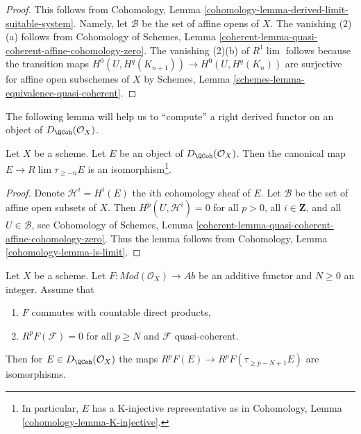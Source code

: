 \begin{proof}
This follows from Cohomology, Lemma
\ref{cohomology-lemma-derived-limit-suitable-system}.
Namely, let $\mathcal{B}$ be the set of affine opens of $X$.
The vanishing (2)(a) follows from
Cohomology of Schemes, Lemma
\ref{coherent-lemma-quasi-coherent-affine-cohomology-zero}.
The vanishing (2)(b) of $R^1\lim$ follows because the transition maps
$H^0(U, H^q(K_{n + 1})) \to H^0(U, H^q(K_n))$ are surjective
for affine open subschemes of $X$ by
Schemes, Lemma \ref{schemes-lemma-equivalence-quasi-coherent}.
\end{proof}

\noindent
The following lemma will help us to ``compute'' a right derived functor
on an object of $D_\QCoh(\mathcal{O}_X)$.

\begin{lemma}
\label{lemma-nice-K-injective}
Let $X$ be a scheme. Let $E$ be an object of
$D_\QCoh(\mathcal{O}_X)$. Then the canonical map
$E \to R\lim \tau_{\geq -n}E$ is an isomorphism\footnote{In particular,
$E$ has a K-injective representative as in
Cohomology, Lemma \ref{cohomology-lemma-K-injective}.}.
\end{lemma}

\begin{proof}
Denote $\mathcal{H}^i = H^i(E)$ the $i$th cohomology sheaf of $E$.
Let $\mathcal{B}$ be the set of affine open subsets of $X$. Then
$H^p(U, \mathcal{H}^i) = 0$ for all $p > 0$, all $i \in \mathbf{Z}$,
and all $U \in \mathcal{B}$, see
Cohomology of Schemes, Lemma
\ref{coherent-lemma-quasi-coherent-affine-cohomology-zero}.
Thus the lemma follows from
Cohomology, Lemma \ref{cohomology-lemma-is-limit}.
\end{proof}

\begin{lemma}
\label{lemma-application-nice-K-injective}
Let $X$ be a scheme. Let $F : \textit{Mod}(\mathcal{O}_X) \to \textit{Ab}$
be an additive functor and $N \geq 0$ an integer. Assume that
\begin{enumerate}
\item $F$ commutes with countable direct products,
\item $R^pF(\mathcal{F}) = 0$ for all $p \geq N$ and $\mathcal{F}$
quasi-coherent.
\end{enumerate}
Then for $E \in D_\QCoh(\mathcal{O}_X)$ the maps
$R^pF(E) \to R^pF(\tau_{\geq p - N + 1}E)$ are isomorphisms.
\end{lemma}

